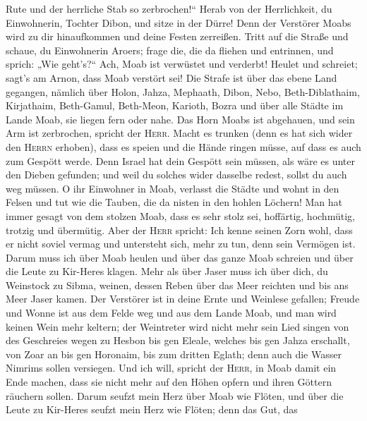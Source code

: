 Rute und der herrliche Stab so zerbrochen!{}``  Herab von
der Herrlichkeit, du Einwohnerin, Tochter Dibon, und sitze in der Dürre!
Denn der Verstörer Moabs wird zu dir hinaufkommen und deine Festen
zerreißen.  Tritt auf die Straße und schaue, du
Einwohnerin Aroers; frage die, die da fliehen und entrinnen, und sprich:
„Wie geht's?{}``  Ach, Moab ist verwüstet und verderbt!
Heulet und schreiet; sagt's am Arnon, dass Moab verstört sei!
 Die Strafe ist über das ebene Land gegangen, nämlich
über Holon, Jahza, Mephaath,  Dibon, Nebo,
Beth-Diblathaim,  Kirjathaim, Beth-Gamul, Beth-Meon,
 Karioth, Bozra und über alle Städte im Lande Moab, sie
liegen fern oder nahe.  Das Horn Moabs ist abgehauen, und
sein Arm ist zerbrochen, spricht der \textsc{Herr}. 
Macht es trunken (denn es hat sich wider den \textsc{Herrn} erhoben),
dass es speien und die Hände ringen müsse, auf dass es auch zum Gespött
werde.  Denn Israel hat dein Gespött sein müssen, als
wäre es unter den Dieben gefunden; und weil du solches wider dasselbe
redest, sollst du auch weg müssen.  O ihr Einwohner in
Moab, verlasst die Städte und wohnt in den Felsen und tut wie die
Tauben, die da nisten in den hohlen Löchern!  Man hat
immer gesagt von dem stolzen Moab, dass es sehr stolz sei, hoffärtig,
hochmütig, trotzig und übermütig.  Aber der \textsc{Herr}
spricht: Ich kenne seinen Zorn wohl, dass er nicht soviel vermag und
untersteht sich, mehr zu tun, denn sein Vermögen ist. 
Darum muss ich über Moab heulen und über das ganze Moab schreien und
über die Leute zu Kir-Heres klagen.  Mehr als über Jaser
muss ich über dich, du Weinstock zu Sibma, weinen, dessen Reben über das
Meer reichten und bis ans Meer Jaser kamen. Der Verstörer ist in deine
Ernte und Weinlese gefallen;  Freude und Wonne ist aus
dem Felde weg und aus dem Lande Moab, und man wird keinen Wein mehr
keltern; der Weintreter wird nicht mehr sein Lied singen 
von des Geschreies wegen zu Hesbon bis gen Eleale, welches bis gen Jahza
erschallt, von Zoar an bis gen Horonaim, bis zum dritten Eglath; denn
auch die Wasser Nimrims sollen versiegen.  Und ich will,
spricht der \textsc{Herr}, in Moab damit ein Ende machen, dass sie nicht
mehr auf den Höhen opfern und ihren Göttern räuchern sollen.
 Darum seufzt mein Herz über Moab wie Flöten, und über
die Leute zu Kir-Heres seufzt mein Herz wie Flöten; denn das Gut, das
